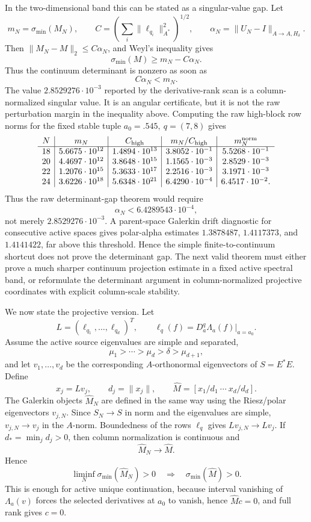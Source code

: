 \documentclass[11pt]{article}
\begin{document}
In the two-dimensional band this can be stated as a singular-value gap.  Let
\[
  m_N=\sigma_{\min}(M_N),\qquad
  C=\left(\sum_i\|\ell_{q_i}\|_{A^\ast}^2\right)^{1/2},\qquad
  \alpha_N=\|U_N-I\|_{A\to A,H_\delta}.
\]
Then \(\|M_N-M\|_2\le C\alpha_N\), and Weyl's inequality gives
\[
  \sigma_{\min}(M)\ge m_N-C\alpha_N.
\]
Thus the continuum determinant is nonzero as soon as
\[
  C\alpha_N<m_N.
\]
The value \(2.8529276\cdot10^{-3}\) reported by the derivative-rank scan is a
column-normalized singular value.  It is an angular certificate, but it is not
the raw perturbation margin in the inequality above.  Computing the raw
high-block row norms for the fixed stable tuple \(a_0=.545,\ q=(7,8)\) gives
\[
\begin{array}{c|c|c|c|c}
N&m_N&C_{\rm high}&m_N/C_{\rm high}&m_N^{\rm norm}\\\hline
18&5.6675\cdot10^{12}&1.4894\cdot10^{13}&3.8052\cdot10^{-1}&5.5268\cdot10^{-1}\\
20&4.4697\cdot10^{12}&3.8648\cdot10^{15}&1.1565\cdot10^{-3}&2.8529\cdot10^{-3}\\
22&1.2076\cdot10^{15}&5.3633\cdot10^{17}&2.2516\cdot10^{-3}&3.1971\cdot10^{-3}\\
24&3.6226\cdot10^{18}&5.6348\cdot10^{21}&6.4290\cdot10^{-4}&6.4517\cdot10^{-2}.
\end{array}
\]
Thus the raw determinant-gap theorem would require
\[
  \alpha_N<6.4289543\cdot10^{-4},
\]
not merely \(2.8529276\cdot10^{-3}\).  A parent-space Galerkin drift diagnostic
for consecutive active spaces gives polar-alpha estimates \(1.3878487\),
\(1.4117373\), and \(1.4141422\), far above this threshold.  Hence the simple
finite-to-continuum shortcut does not prove the determinant gap.  The next
valid theorem must either prove a much sharper continuum projection estimate in
a fixed active spectral band, or reformulate the determinant argument in
column-normalized projective coordinates with explicit column-scale stability.

We now state the projective version.  Let
\[
  L=(\ell_{q_1},\ldots,\ell_{q_d})^T,\qquad
  \ell_q(f)=D_a^q\Lambda_a(f)|_{a=a_0}.
\]
Assume the active source eigenvalues are simple and separated,
\[
  \mu_1>\cdots>\mu_d>\delta>\mu_{d+1},
\]
and let \(v_1,\ldots,v_d\) be the corresponding \(A\)-orthonormal eigenvectors
of \(S=E^\ast E\).  Define
\[
  x_j=Lv_j,\qquad d_j=\|x_j\|,\qquad
  \widehat M=[x_1/d_1\ \cdots\ x_d/d_d].
\]
The Galerkin objects \(\widehat M_N\) are defined in the same way using the
Riesz/polar eigenvectors \(v_{j,N}\).  Since \(S_N\to S\) in norm and the
eigenvalues are simple, \(v_{j,N}\to v_j\) in the \(A\)-norm.  Boundedness of
the rows \(\ell_q\) gives \(Lv_{j,N}\to Lv_j\).  If \(d_\ast=\min_jd_j>0\),
then column normalization is continuous and
\[
  \widehat M_N\to \widehat M.
\]
Hence
\[
  \liminf_N\sigma_{\min}(\widehat M_N)>0
  \quad\Longrightarrow\quad
  \sigma_{\min}(\widehat M)>0.
\]
This is enough for active unique continuation, because interval vanishing of
\(\Lambda_a(v)\) forces the selected derivatives at \(a_0\) to vanish, hence
\(\widehat M c=0\), and full rank gives \(c=0\).
\end{document}
